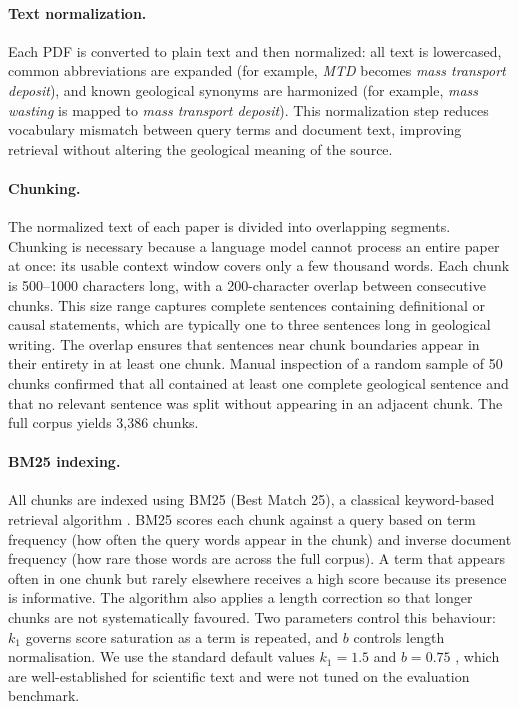 \documentclass[10pt]{article}
\begin{document}
\paragraph{Text normalization.}
Each PDF is converted to plain text and then normalized: all
text is lowercased, common abbreviations are expanded (for
example, \emph{MTD} becomes \emph{mass transport deposit}),
and known geological synonyms are harmonized (for example,
\emph{mass wasting} is mapped to \emph{mass transport
deposit}).
This normalization step reduces vocabulary mismatch between
query terms and document text, improving retrieval without
altering the geological meaning of the source.

\paragraph{Chunking.}
The normalized text of each paper is divided into overlapping
segments.
Chunking is necessary because a language model cannot process
an entire paper at once: its usable context window covers only
a few thousand words.
Each chunk is 500--1000 characters long, with a 200-character
overlap between consecutive chunks.
This size range captures complete sentences containing
definitional or causal statements, which are typically one
to three sentences long in geological writing.
The overlap ensures that sentences near chunk boundaries
appear in their entirety in at least one chunk.
Manual inspection of a random sample of 50 chunks confirmed
that all contained at least one complete geological sentence
and that no relevant sentence was split without appearing
in an adjacent chunk.
The full corpus yields 3,386 chunks.

\paragraph{BM25 indexing.}
All chunks are indexed using BM25 (Best Match 25), a
classical keyword-based retrieval algorithm
\citep{robertson1994okapi, robertson2009probabilistic}.
BM25 scores each chunk against a query based on term
frequency (how often the query words appear in the chunk)
and inverse document frequency (how rare those words are
across the full corpus).
A term that appears often in one chunk but rarely elsewhere
receives a high score because its presence is informative.
The algorithm also applies a length correction so that longer
chunks are not systematically favoured.
Two parameters control this behaviour: $k_1$ governs score
saturation as a term is repeated, and $b$ controls length
normalisation.
We use the standard default values $k_1 = 1.5$ and
$b = 0.75$ \citep{robertson2009probabilistic}, which are
well-established for scientific text and were not tuned on
the evaluation benchmark.
\end{document}
